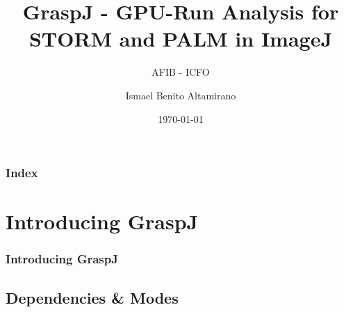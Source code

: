 \documentclass[aspectratio=169]{beamer}
\title[GraspJ]{GraspJ - GPU-Run Analysis for STORM and PALM in ImageJ}
\subtitle{AFIB - ICFO}
\author[Ismael Benito]{\bigskip \small Ismael Benito Altamirano}
\date[AFIB - ICFO]{\small \today}
\begin{document}


\frame{\titlepage}

\begin{frame}
  \frametitle{Index}
  \tableofcontents
\end{frame}

\section{Introducing GraspJ}

\begin{frame}
\frametitle{Introducing GraspJ}


\end{frame}


\subsection{Dependencies \& Modes}
\end{document}
